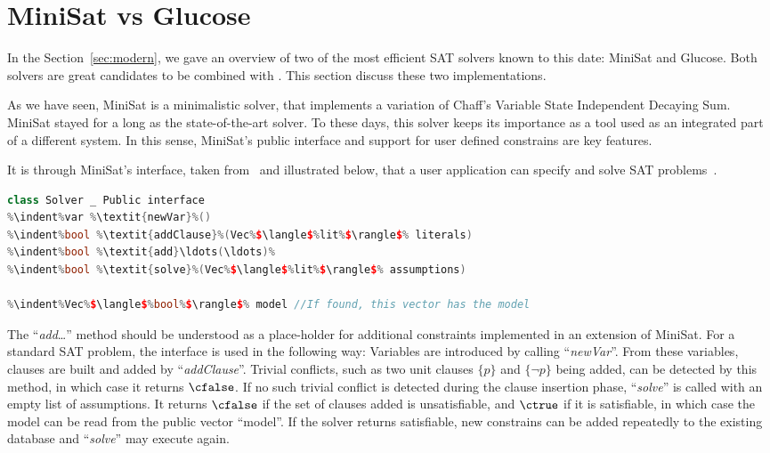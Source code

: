 \section{MiniSat vs Glucose}
In the Section~\ref{sec:modern}, we gave an overview of two of the most
efficient SAT solvers known to this date: MiniSat and Glucose. Both solvers are
great candidates to be combined with \ksp. This section discuss these two
implementations. 

As we have seen, MiniSat is a minimalistic solver, that implements a variation
of Chaff's Variable State Independent Decaying Sum. MiniSat stayed for a long as
the state-of-the-art solver. To these days, this solver keeps its
importance as a tool used as an integrated part of a different system. In this
sense, MiniSat's public interface and support for user defined constrains are
key features.

It is through MiniSat's interface, taken from~\cite{een2003extensible} and
illustrated below, that a user application can specify and solve SAT
problems~\cite{een2003extensible}. 

\begin{lstlisting}[frame=single, language=C++,morekeywords={var,Solver,Vec,lit},escapechar=\%,
commentstyle=\color{gray}]
class Solver _ Public interface
%\indent%var %\textit{newVar}%()
%\indent%bool %\textit{addClause}%(Vec%$\langle$%lit%$\rangle$% literals)
%\indent%bool %\textit{add}\ldots(\ldots)%
%\indent%bool %\textit{solve}%(Vec%$\langle$%lit%$\rangle$% assumptions)

%\indent%Vec%$\langle$%bool%$\rangle$% model //If found, this vector has the model
\end{lstlisting}

The ``\textit{add}\ldots'' method should be understood as a place-holder for
additional constraints implemented in an extension of MiniSat. For a standard
SAT problem, the interface is used in the following way: Variables are
introduced by calling ``\textit{newVar}''. From these variables, clauses are
built and added by ``\textit{addClause}''.  Trivial conflicts, such as two unit
clauses $\{p\}$ and $\{\neg p\}$ being added, can be detected by this method, in
which case it returns $\cfalse$. If no such trivial conflict is detected during
the clause insertion phase, ``\textit{solve}'' is called with an empty list of
assumptions. It returns $\cfalse$ if the set of clauses added is unsatisfiable,
and $\ctrue$ if it is satisfiable, in which case the model can be read from the
public vector ``model''.  If the solver returns satisfiable, new constrains can
be added repeatedly to the existing database and ``\textit{solve}'' may execute again. 

